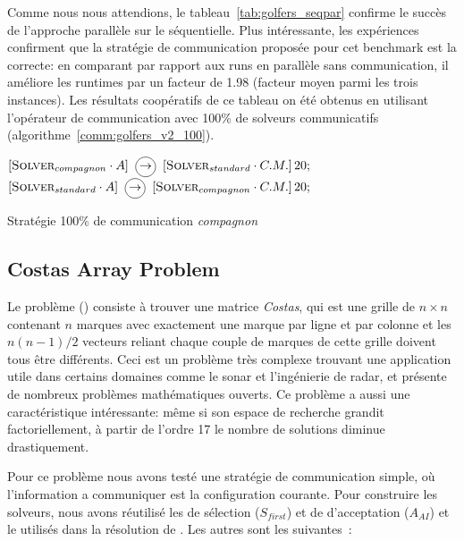 Comme nous nous attendions, le tableau~\ref{tab:golfers_seqpar} confirme le succès de l'approche parallèle sur le séquentielle. Plus intéressante, les expériences confirment que la stratégie de communication proposée pour cet benchmark est la correcte: en comparant par rapport aux runs en parallèle sans communication, il améliore les runtimes par un facteur de 1.98 (facteur moyen parmi les trois instances). Les résultats coopératifs de ce tableau on été obtenus en utilisant l'opérateur de communication \oneTone{} avec 100\% de solveurs communicatifs (algorithme~\ref{comm:golfers_v2_100}). 

\begin{algorithm}[!h]
\dontprintsemicolon
\SetNoline
$\left[\eqsolverposl{compagnon}\cdot A\right] \onetoone \left[\eqsolverposl{standard}\cdot C.M.\right]20;$\;
$\left[\eqsolverposl{standard}\cdot A\right] \onetoone \left[\eqsolverposl{compagnon}\cdot C.M.\right]20;$
\caption{Stratégie 100\% de communication \textit{compagnon}}\label{comm:golfers_v2_100}
\end{algorithm}






\subsection{Costas Array Problem}

Le problème \carr{} (\CARRP) consiste à trouver une matrice {\it Costas}, qui est une grille de $n \times n$ contenant $n$ marques avec exactement une marque par ligne et par colonne et les $n(n-1)/2 $ vecteurs reliant chaque couple de marques de cette grille doivent tous être différents. Ceci est un problème très complexe trouvant une application utile dans certains domaines comme le sonar et l'ingénierie de radar, et présente de nombreux problèmes mathématiques ouverts. Ce problème a aussi une caractéristique intéressante: même si son espace de recherche grandit factoriellement, à partir de l'ordre 17 le nombre de solutions diminue drastiquement.

Pour ce problème nous avons testé une stratégie de communication simple, où l'information a communiquer est la configuration courante. Pour construire les solveurs, nous avons réutilisé les \oms{} de sélection ($S_{first}$) et de d'acceptation ($A_{AI}$) et le \opch{} utilisés dans la résolution de \SGP{}. Les autres \oms{} sont les suivantes~:

